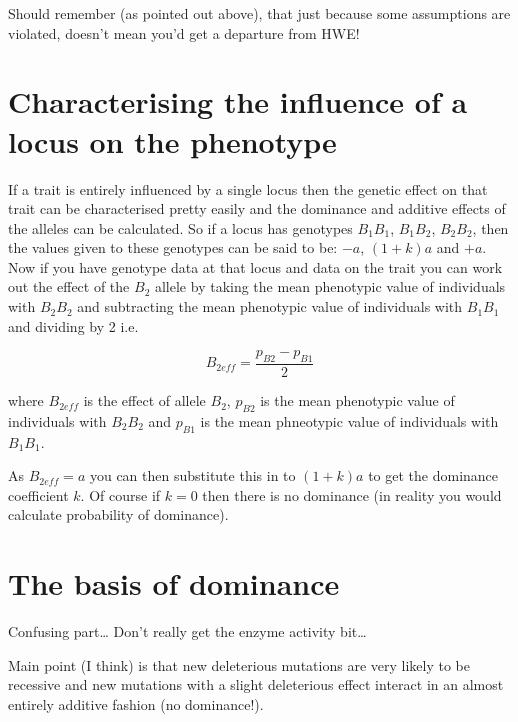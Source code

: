 \documentclass[
]{book}
\begin{document}
Should remember (as pointed out above), that just because some assumptions are violated, doesn't mean you'd get a departure from HWE!

\hypertarget{characterising-the-influence-of-a-locus-on-the-phenotype}{%
\section{Characterising the influence of a locus on the phenotype}\label{characterising-the-influence-of-a-locus-on-the-phenotype}}

If a trait is entirely influenced by a single locus then the genetic effect on that trait can be characterised pretty easily and the dominance and additive effects of the alleles can be calculated. So if a locus has genotypes \(B_1B_1\), \(B_1B_2\), \(B_2B_2\), then the values given to these genotypes can be said to be: \(-a\), \((1 + k)a\) and \(+a\). Now if you have genotype data at that locus and data on the trait you can work out the effect of the \(B_2\) allele by taking the mean phenotypic value of individuals with \(B_2B_2\) and subtracting the mean phenotypic value of individuals with \(B_1B_1\) and dividing by 2 i.e.

\begin{equation}
  B_{2eff} = \frac{p_{B2} - p_{B1}} {2}
  \label{eq:effect-of-b2}
\end{equation}

where \(B_{2eff}\) is the effect of allele \(B_2\), \(p_{B2}\) is the mean phenotypic value of individuals with \(B_2B_2\) and \(p_{B1}\) is the mean phneotypic value of individuals with \(B_1B_1\).

As \(B_{2eff} = a\) you can then substitute this in to \((1 + k)a\) to get the dominance coefficient \(k\). Of course if \(k = 0\) then there is no dominance (in reality you would calculate probability of dominance).

\hypertarget{the-basis-of-dominance}{%
\section{The basis of dominance}\label{the-basis-of-dominance}}

Confusing part\ldots{} Don't really get the enzyme activity bit\ldots{}

Main point (I think) is that new deleterious mutations are very likely to be recessive and new mutations with a slight deleterious effect interact in an almost entirely additive fashion (no dominance!).
\end{document}
